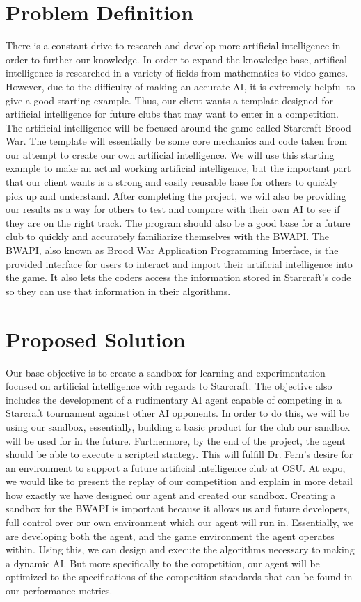 \documentclass[10pt,letterpaper,onecolumn,draftclsnofoot]{IEEEtran}
\begin{document}
\section{Problem Definition}
There is a constant drive to research and develop more artificial intelligence in order to further our knowledge. In order to expand the knowledge base, artifical intelligence is researched in a variety of fields from mathematics to video games. However, due to the difficulty of making an accurate AI, it is extremely helpful to give a good starting example. Thus, our client wants a template designed for artificial intelligence for future clubs that may want to enter in a competition. The artificial intelligence will be focused around the game called Starcraft Brood War. The template will essentially be some core mechanics and code taken from our attempt to create our own artificial intelligence. We will use this starting example to make an actual working artificial intelligence, but the important part that our client wants is a strong and easily reusable base for others to quickly pick up and understand. After completing the project, we will also be providing our results as a way for others to test and compare with their own AI to see if they are on the right track. The program should also be a good base for a future club to quickly and accurately familiarize themselves with the BWAPI. The BWAPI, also known as Brood War Application Programming Interface, is the provided interface for users to interact and import their artificial intelligence into the game. It also lets the coders access the information stored in Starcraft's code so they can use that information in their algorithms.

\section{Proposed Solution}
Our base objective is to create a sandbox for learning and experimentation focused on artificial intelligence with regards to Starcraft. The objective also includes the development of a rudimentary AI agent capable of competing in a Starcraft tournament against other AI opponents. In order to do this, we will be using our sandbox, essentially, building a basic product for the club our sandbox will be used for in the future. Furthermore, by the end of the project, the agent should be able to execute a scripted strategy. This will fulfill Dr. Fern's desire for an environment to support a future artificial intelligence club at OSU. At expo, we would like to present the replay of our competition and explain in more detail how exactly we have designed our agent and created our sandbox.
Creating a sandbox for the BWAPI is important because it allows us and future developers, full control over our own environment which our agent will run in. Essentially, we are developing both the agent, and the game environment the agent operates within. Using this, we can design and execute the algorithms necessary to making a dynamic AI. But more specifically to the competition, our agent will be optimized to the specifications of the competition standards that can be found in our performance metrics. 
\end{document}
